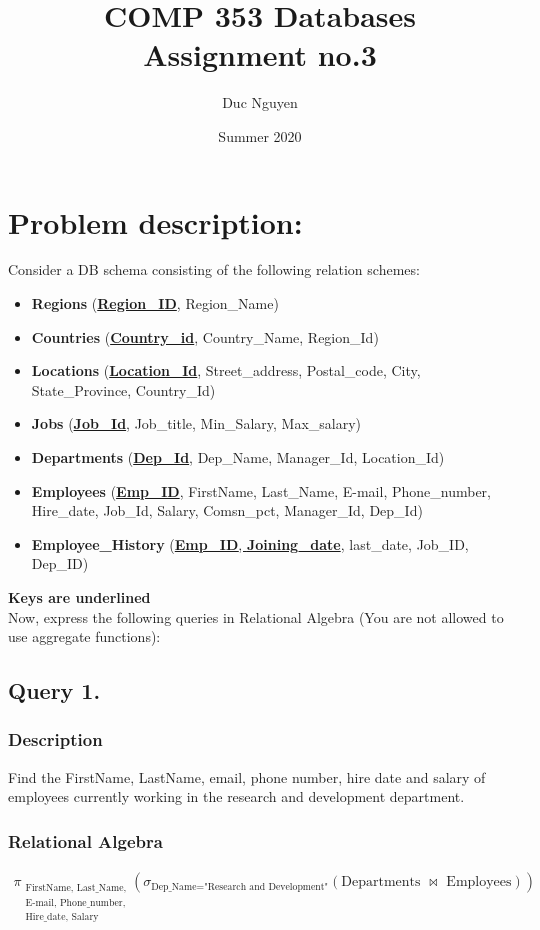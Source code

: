 \documentclass[a4paper]{article}
\title{COMP 353 Databases\\
Assignment no.3}
\author{Duc Nguyen}
\affil{Gina Cody School of Computer Science and Software Engineering \\
    Concordia University, Montreal, QC, Canada}
\date{Summer 2020}
\begin{document}
\maketitle

\newpage
\tableofcontents
\newpage

\section{Problem description:}
Consider a DB schema consisting of the following relation schemes:
\begin{itemize}
    \item \textbf{Regions} (\underline{\textbf{Region\_ID}}, Region\_Name)
    \item \textbf{Countries} (\underline{\textbf{Country\_id}}, Country\_Name, Region\_Id)
    \item \textbf{Locations} (\underline{\textbf{Location\_Id}}, Street\_address, Postal\_code, City, State\_Province, Country\_Id)
    \item \textbf{Jobs} (\underline{\textbf{Job\_Id}},  Job\_title, Min\_Salary, Max\_salary)
    \item \textbf{Departments} (\underline{\textbf{Dep\_Id}},  Dep\_Name, Manager\_Id,
Location\_Id)
    \item \textbf{Employees} (\underline{\textbf{Emp\_ID}},  FirstName, Last\_Name, E-mail,
Phone\_number, Hire\_date, Job\_Id, Salary, Comsn\_pct,
Manager\_Id, Dep\_Id)
    \item \textbf{Employee\_History} (\underline{\textbf{Emp\_ID}, \textbf{Joining\_date}}, last\_date, Job\_ID, Dep\_ID)
\end{itemize}

\textbf{Keys are underlined} \\
Now, express the following queries in Relational Algebra (You are not allowed to use
aggregate functions):

\newpage
\subsection{Query 1.}
\subsubsection{Description}
Find the FirstName, LastName, email, phone number, hire date and salary of
employees currently working in the research and development department.
\subsubsection{Relational Algebra}
\begin{align*}
\pi_{\substack{
        \text{FirstName, Last\_Name,} \\ 
        \text{E-mail, Phone\_number,}\\
        \text{Hire\_date, Salary}
    }
}
(\sigma_{\text{Dep\_Name="Research and Development"}} (\text{Departments } \bowtie\text{ Employees})  )
\end{align*}
\end{document}
